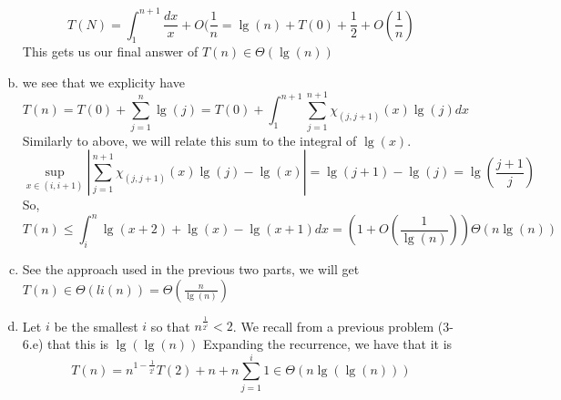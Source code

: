 \documentclass{article}
\begin{document}
\begin{enumerate}[a.]
\[
T(N) = \int_1^{n+1} \frac{dx}{x} + O(\frac{1}{n} = \lg(n) + T(0) + \frac{1}{2} + O(\frac{1}{n})
\]
This gets us our final answer of $T(n) \in \Theta(\lg(n))$
\item
we see that we explicity have
\[
T(n) = T(0) +\sum_{j=1}^n \lg(j) = T(0) + \int_1^{n+1} \sum_{j=1}^{n+1} \chi_{(j,j+1)}(x)\lg(j) dx 
\]
Similarly to above, we will relate this sum to the integral of $\lg(x)$. 
\[
\sup_{x\in (i,i+1)}  \left|\sum_{j=1}^{n+1} \chi_{(j,j+1)}(x)\lg(j)  - \lg(x)\right| = \lg(j+1) - \lg(j) = \lg\left(\frac{j+1}{j}\right)
\]
So, 
\[
T(n) \le \int_{i}^n \lg(x+2) + \lg(x) - \lg(x+1) dx  = (1  + O(\frac{1}{\lg(n)}))\Theta(n\lg(n))
\]
\item
See the approach used in the previous two parts, we will get $T(n) \in \Theta(li(n))= \Theta( \frac{n}{\lg(n)})$
\item
Let $i$ be the smallest $i$ so that $n^{\frac{1}{2^i}}<2$. We recall from a previous problem (3-6.e) that this is $\lg(\lg(n))$ Expanding the recurrence, we have that it is 
\[
T(n) = n^{1 - \frac{1}{2^i}} T(2) + n + n \sum_{j=1}^i 1 \in \Theta(n\lg(\lg(n)))
\]

\end{enumerate}
\end{document}
